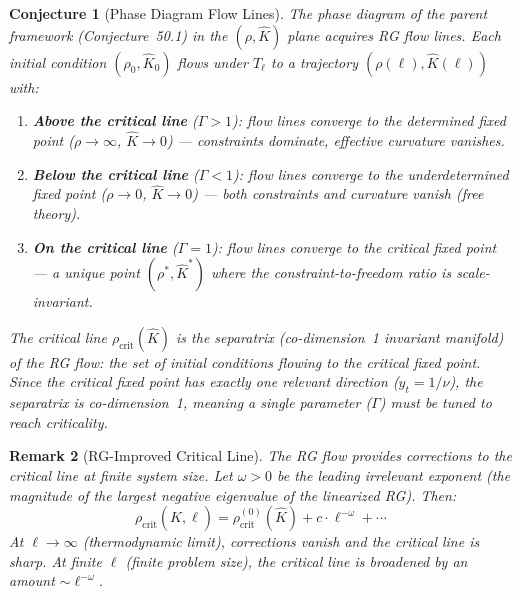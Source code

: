 \documentclass[11pt,letterpaper]{article}
\newtheorem{conjecture}{Conjecture}[section]
\newtheorem{remark}[conjecture]{Remark}
\newcommand{\Khat}{\hat{K}}
\begin{document}
\begin{conjecture}[Phase Diagram Flow 
Lines]\label{conj:phase_flow}
The phase diagram of the parent framework (Conjecture~50.1) in the 
$(\rho, \Khat)$ plane acquires RG flow lines. Each initial 
condition $(\rho_0, \Khat_0)$ flows under $T_\ell$ to a 
trajectory $(\rho(\ell), \Khat(\ell))$ with:

\begin{enumerate}[label=(\alph*)]
    \item \textbf{Above the critical line} ($\Gamma > 1$): flow 
    lines converge to the determined fixed point ($\rho \to \infty$, 
    $\Khat \to 0$) --- constraints dominate, effective curvature 
    vanishes.
    
    \item \textbf{Below the critical line} ($\Gamma < 1$): flow 
    lines converge to the underdetermined fixed point 
    ($\rho \to 0$, $\Khat \to 0$) --- both constraints and 
    curvature vanish (free theory).
    
    \item \textbf{On the critical line} ($\Gamma = 1$): flow lines 
    converge to the critical fixed point --- a unique point 
    $(\rho^*, \Khat^*)$ where the constraint-to-freedom ratio is 
    scale-invariant.
\end{enumerate}

The critical line $\rho_{\mathrm{crit}}(\Khat)$ is the 
\emph{separatrix} (co-dimension~1 invariant manifold) of the RG 
flow: the set of initial conditions flowing to the critical fixed 
point. Since the critical fixed point has exactly one relevant 
direction ($y_t = 1/\nu$), the separatrix is co-dimension~1, 
meaning a single parameter ($\Gamma$) must be tuned to reach 
criticality.
\end{conjecture}

\begin{remark}[RG-Improved Critical Line]\label{rem:rg_improved}
The RG flow provides corrections to the critical line at finite 
system size. Let $\omega > 0$ be the leading irrelevant exponent 
(the magnitude of the largest negative eigenvalue of the linearized 
RG). Then:
\begin{equation}\label{eq:rg_improved_line}
    \rho_{\mathrm{crit}}(\Khat, \ell) = 
    \rho_{\mathrm{crit}}^{(0)}(\Khat) + c \cdot \ell^{-\omega} 
    + \cdots
\end{equation}
At $\ell \to \infty$ (thermodynamic limit), corrections vanish and 
the critical line is sharp. At finite $\ell$ (finite problem size), 
the critical line is broadened by an amount $\sim \ell^{-\omega}$.
\end{remark}
\end{document}
